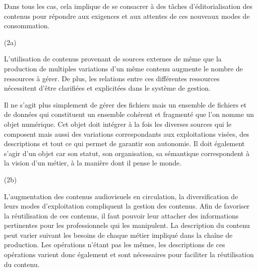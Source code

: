 \begin{liste}
	Dans tous les cas, cela implique de se consacrer à des tâches d'éditorialisation des contenus pour répondre aux exigences et aux attentes de ces nouveaux modes de consommation.\\


	\item[(2a)]  

	L'utilisation de contenus provenant de sources externes de même que la production de multiples variations d'un même contenu augmente le nombre de ressources à gérer. 
	De plus, les relations entre ces différentes ressources nécessitent d'être clarifiées et explicitées dans le système de gestion. 
	
	Il ne s'agit plus simplement de gérer des fichiers mais un ensemble de fichiers et de données qui constituent un ensemble cohérent et fragmenté que l'on nomme un objet numérique. 
	Cet objet doit intégrer à la fois les diverses sources qui le composent mais aussi des variations correspondants aux exploitations visées, des descriptions et tout ce qui permet de garantir son autonomie. 
	Il doit également s'agir d'un objet  car son statut, son organisation, sa sémantique correspondent à la vision d'un métier, à la manière dont il pense le monde. 



	\item[(2b)] 

	L'augmentation des contenus audiovisuels en circulation, la diversification de leurs modes d'exploitation compliquent la gestion des contenus.  
	Afin de favoriser la réutilisation de ces contenus, il faut pouvoir leur attacher des informations pertinentes pour les professionnels qui les manipulent. 
	La description du contenu peut varier suivant les besoins de chaque métier impliqué dans la chaîne de production. 
	Les opérations n'étant pas les mêmes, les descriptions de ces opérations varient donc également et sont nécessaires pour faciliter la réutilisation du contenu. 


\end{liste}
